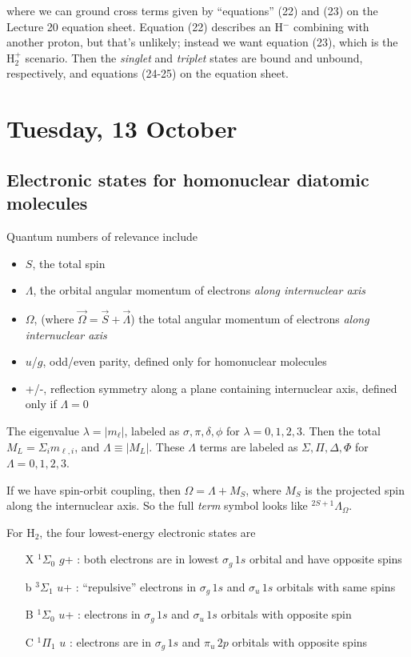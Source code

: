 \documentclass{tufte-handout}
\renewcommand{\textrm}{\textsf}
\newcommand{\term}[4]{$^{#1}\textrm{#2}_{#3}^{\textrm{#4}}$}
\begin{document}
where we can ground cross terms given by ``equations'' (22) and (23) on the Lecture 20 equation sheet. Equation (22) describes an H$^-$ combining with another proton, but that's unlikely; instead we want equation (23), which is the H$_2^+$ scenario. Then the \textit{singlet} and \textit{triplet} states are bound and unbound, respectively, and equations (24-25) on the equation sheet.

\section{Tuesday, 13 October}
\subsection{Electronic states for homonuclear diatomic molecules}
Quantum numbers of relevance include
\begin{itemize}
\item $S$, the total spin
\item $\Lambda$, the orbital angular momentum of electrons \textit{along internuclear axis}
\item $\Omega$, (where $\vec \Omega = \vec S + \vec \Lambda$) the total angular momentum of electrons \textit{along internuclear axis}
\item $u$/$g$, odd/even parity, defined only for homonuclear molecules
\item +/-, reflection symmetry along a plane containing internuclear axis, defined only if $\Lambda = 0$
\end{itemize}
The eigenvalue $\lambda = |m_\ell|$, labeled as $\sigma, \pi, \delta, \phi$ for $\lambda= 0,1,2,3$. Then the total $M_L = \Sigma_i m_{\ell, i}$, and $\Lambda \equiv |M_L|$. These $\Lambda$ terms are labeled as $\Sigma, \Pi, \Delta, \Phi$ for $\Lambda = 0, 1, 2, 3$.

If we have spin-orbit coupling, then $\Omega = \Lambda + M_S$, where $M_S$ is the projected spin along the internuclear axis. So the full \textit{term} symbol looks like $^{2S+1} \Lambda_\Omega$.

For H$_2$, the four lowest-energy electronic states are
\begin{itemize}
\item[X] \term{1}{$\Sigma$}{0}{} $g$+ : both electrons are in lowest $\sigma_g\, 1s$ orbital and have opposite spins
\item[b] \term{3}{$\Sigma$}{1}{} $u$+ : ``repulsive'' electrons in $\sigma_g\, 1s$ and $\sigma_u\, 1s$ orbitals with same spins
\item[B] \term{1}{$\Sigma$}{0}{} $u$+ : electrons in $\sigma_g\, 1s$ and $\sigma_u\, 1s$ orbitals with opposite spin
\item[C] \term{1}{$\Pi$}{1}{} $u$ : electrons are in $\sigma_g\, 1s$ and $\pi_u\, 2p$ orbitals with opposite spins
\end{itemize}
\end{document}
